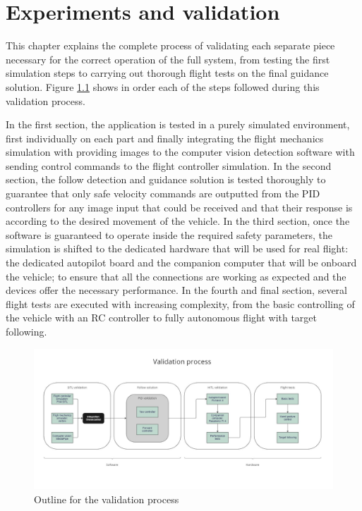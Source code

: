 \chapter{Experiments and validation}
\label{chap:validation}

This chapter explains the complete process of validating each separate piece necessary for the correct operation of the full system, from testing the first simulation steps to carrying out thorough flight tests on the final guidance solution.
Figure \ref{fig:validation-chart} shows in order each of the steps followed during this validation process.

In the first section, the application is tested in a purely simulated environment, first individually on each part and finally integrating the flight mechanics simulation 
 with providing images to the computer vision detection software with sending control commands to the flight controller simulation.
 In the second section, the follow detection and guidance solution is tested thoroughly to guarantee that only safe velocity commands are outputted from the PID controllers for any image input that could be received and that their response is according to the desired movement of the vehicle.
 In the third section, once the software is guaranteed to operate inside the required safety parameters, the simulation is shifted to the dedicated hardware that will be used for real flight: the dedicated autopilot board and the companion computer that will be onboard the vehicle; to ensure that all the connections are working as expected and the devices offer the necessary performance.
 In the fourth and final section, several flight tests are executed with increasing complexity, from the basic controlling of the vehicle with an RC controller to fully autonomous flight with target following.

\begin{figure}
  \centering
  \includegraphics[width=\textwidth, keepaspectratio]{img/validation-chart.jpg}
  \caption{Outline for the validation process}\label{fig:validation-chart}
\end{figure}

